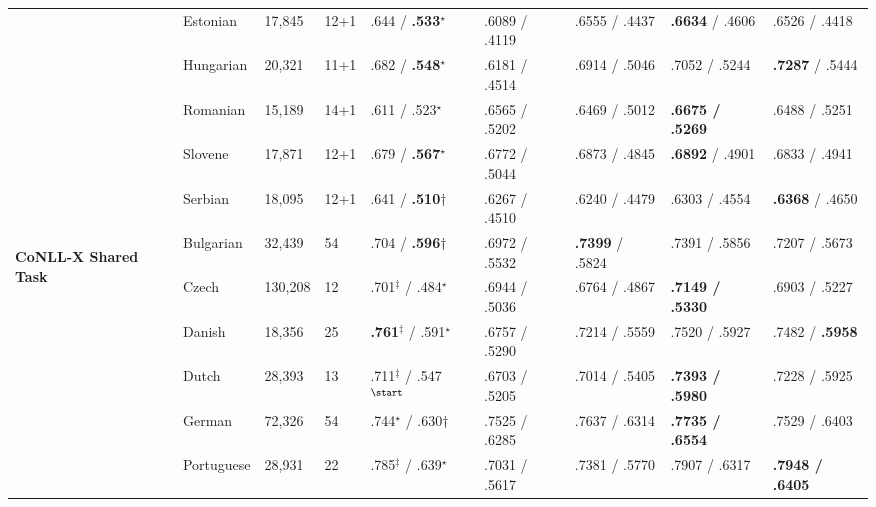 \begin{table}[ht]
\begin{flushleft}
\begin{tabular}{|@{ }l@{ }|@{ }l@{ }|@{ }l@{ }|@{ }l@{ }|@{ }l@{ }|@{ }l@{ }|@{ }l@{ }|@{ }l@{ }|@{ }l@{ }|}
        & Estonian   & 17,845  & 12+1 & .644 / \textbf{.533}$^\star$    & .6089 / .4119 & .6555 / .4437 & \textbf{.6634} / .4606     & .6526 / .4418 \\
        & Hungarian  & 20,321  & 11+1 & .682 / \textbf{.548}$^\star$    & .6181 / .4514 & .6914 / .5046 & .7052 / .5244     & \textbf{.7287} / .5444 \\
        & Romanian   & 15,189  & 14+1 & .611 / .523$^\star$    & .6565 / .5202 & .6469 / .5012 & \textbf{.6675 / .5269}     & .6488 / .5251 \\
        & Slovene    & 17,871  & 12+1 & .679 / \textbf{.567}$^\star$    & .6772 / .5044 & .6873 / .4845 & \textbf{.6892} / .4901     & .6833 / .4941 \\
        & Serbian    & 18,095  & 12+1 & .641 / \textbf{.510}$\dagger$        & .6267 / .4510 & .6240 / .4479 & .6303 / .4554     & \textbf{.6368} / .4650 \\
        \hline %
        \multirow{10}{*}{\begin{sideways}\textbf{CoNLL-X Shared Task}\end{sideways}}
        & Bulgarian  & 32,439  & 54   & .704 / \textbf{.596}$\dagger$        & .6972 / .5532 & \textbf{.7399} / .5824  & .7391 / .5856     & .7207 / .5673 \\
        & Czech      & 130,208 & 12   & .701$^\ddagger$ / .484$^\star$           & .6944 / .5036 & .6764 / .4867  & \textbf{.7149 / .5330}     & .6903 / .5227 \\
        & Danish     & 18,356  & 25   & \textbf{.761}$^\ddagger$ / .591$^\star$           & .6757 / .5290 & .7214 / .5559  & .7520 / .5927     & .7482 / \textbf{.5958} \\
        & Dutch      & 28,393  & 13   & .711$^\ddagger$ / .547$^\start$ & .6703 / .5205 & .7014 / .5405  & \textbf{.7393 / .5980}     & .7228 / .5925 \\
        & German     & 72,326  & 54   & .744$^\star$ / .630$\dagger$& .7525 / .6285 & .7637 / .6314  & \textbf{.7735 / .6554}     & .7529 / .6403 \\
        & Portuguese & 28,931  & 22   & .785$^\ddagger$ / .639$^\star$           & .7031 / .5617 & .7381 / .5770  & .7907 / .6317     & \textbf{.7948 / .6405} \\

\end{tabular}
\end{flushleft}
\end{table}
